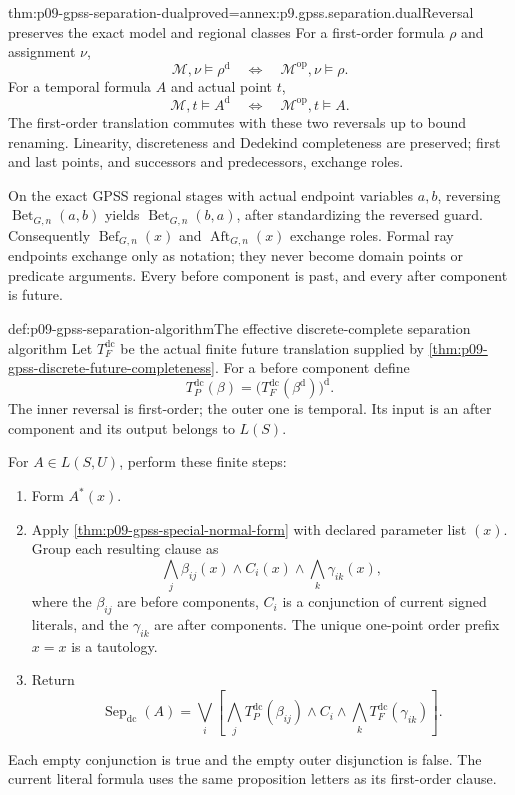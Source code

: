 \begin{hblemma}{thm:p09-gpss-separation-dual}{proved=annex:p9.gpss.separation.dual}{Reversal preserves the exact model and regional classes}
For a first-order formula \(\rho\) and assignment \(\nu\),
\[
           \mathcal M,\nu\models\rho^{\mathrm d}
                \quad\Longleftrightarrow\quad
           \mathcal M^{\mathrm{op}},\nu\models\rho.
\]
For a temporal formula \(A\) and actual point \(t\),
\[
           \mathcal M,t\models A^{\mathrm d}
                \quad\Longleftrightarrow\quad
           \mathcal M^{\mathrm{op}},t\models A.
\]
The first-order translation commutes with
these two reversals up to bound renaming.
Linearity, discreteness and Dedekind completeness
are preserved; first and last points, and
successors and predecessors, exchange roles.

On the exact GPSS regional stages with actual
endpoint variables \(a,b\), reversing
\(\operatorname{Bet}_{G,n}(a,b)\) yields
\(\operatorname{Bet}_{G,n}(b,a)\), after
standardizing the reversed guard. Consequently
\(\operatorname{Bef}_{G,n}(x)\) and
\(\operatorname{Aft}_{G,n}(x)\) exchange roles.
Formal ray endpoints exchange only as notation;
they never become domain points or predicate
arguments. Every before component is past,
and every after component is future.
\end{hblemma}

\begin{hbdefinition}{def:p09-gpss-separation-algorithm}{The effective discrete-complete separation algorithm}
Let \(T_F^{\mathrm{dc}}\) be the actual
finite future translation supplied by
\cref{thm:p09-gpss-discrete-future-completeness}.
For a before component define
\[
        T_P^{\mathrm{dc}}(\beta)
                   =\bigl(T_F^{\mathrm{dc}}
                                      (\beta^{\mathrm d})\bigr)^{\mathrm d}.
\]
The inner reversal is first-order; the outer
one is temporal. Its input is an after
component and its output belongs to \(L(S)\).

For \(A\in L(S,U)\), perform these finite steps:
\begin{enumerate}
\item Form \(A^*(x)\).
\item Apply \cref{thm:p09-gpss-special-normal-form}
      with declared parameter list \((x)\).
      Group each resulting clause as
      \[
       \bigwedge_j\beta_{ij}(x)\land
                     C_i(x)\land
       \bigwedge_k\gamma_{ik}(x),
      \]
      where the \(\beta_{ij}\) are before
      components, \(C_i\) is a conjunction
      of current signed literals, and the
      \(\gamma_{ik}\) are after components.
      The unique one-point order prefix \(x=x\)
      is a tautology.
\item Return
      \[
       \operatorname{Sep}_{\mathrm{dc}}(A)=
       \bigvee_i\left[
        \bigwedge_j T_P^{\mathrm{dc}}(\beta_{ij})
        \land C_i
        \land\bigwedge_k T_F^{\mathrm{dc}}(\gamma_{ik})
                    \right].
      \]
\end{enumerate}
Each empty conjunction is true and the empty
outer disjunction is false. The current literal
formula uses the same proposition letters as
its first-order clause.
\end{hbdefinition}

